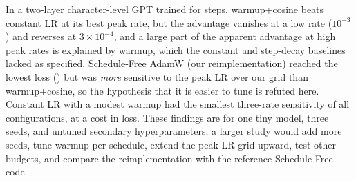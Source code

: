 In a two-layer character-level GPT trained for  steps, warmup+cosine beats constant LR at its best peak rate, but the advantage vanishes at a low rate ($10^{-3}$) and reverses at $3\times10^{-4}$, and a large part of the apparent advantage at high peak rates is explained by warmup, which the constant and step-decay baselines lacked as specified. Schedule-Free AdamW (our reimplementation) reached the lowest loss () but was \emph{more} sensitive to the peak LR over our grid than warmup+cosine, so the hypothesis that it is easier to tune is refuted here. Constant LR with a modest warmup had the smallest three-rate sensitivity of all configurations, at a cost in loss. These findings are for one tiny model, three seeds, and untuned secondary hyperparameters; a larger study would add more seeds, tune warmup per schedule, extend the peak-LR grid upward, test other budgets, and compare the reimplementation with the reference Schedule-Free code.
